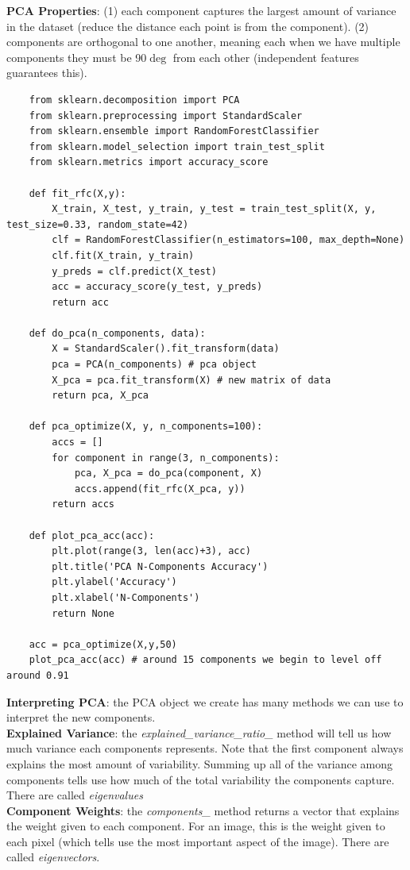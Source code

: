 \documentclass[11pt, a4paper]{article}
\begin{document}
\begin{spacing}{1.1}
	\noindent \textbf{PCA Properties}: (1) each component captures the largest amount of variance in the dataset (reduce the distance each point is from the component). (2) components are orthogonal to one another, meaning each when we have multiple components they must be 90$\deg$ from each other (independent features guarantees this).
	\begin{lstlisting}
	from sklearn.decomposition import PCA
	from sklearn.preprocessing import StandardScaler
	from sklearn.ensemble import RandomForestClassifier
	from sklearn.model_selection import train_test_split
	from sklearn.metrics import accuracy_score
	
	def fit_rfc(X,y):
		X_train, X_test, y_train, y_test = train_test_split(X, y, test_size=0.33, random_state=42)
		clf = RandomForestClassifier(n_estimators=100, max_depth=None)
		clf.fit(X_train, y_train)
		y_preds = clf.predict(X_test)
		acc = accuracy_score(y_test, y_preds)
		return acc
	
	def do_pca(n_components, data):
		X = StandardScaler().fit_transform(data)
		pca = PCA(n_components) # pca object
		X_pca = pca.fit_transform(X) # new matrix of data
		return pca, X_pca
	
	def pca_optimize(X, y, n_components=100):
		accs = []
		for component in range(3, n_components):
			pca, X_pca = do_pca(component, X)
			accs.append(fit_rfc(X_pca, y))
		return accs
	
	def plot_pca_acc(acc):
		plt.plot(range(3, len(acc)+3), acc)
		plt.title('PCA N-Components Accuracy')
		plt.ylabel('Accuracy')
		plt.xlabel('N-Components')
		return None
	
	acc = pca_optimize(X,y,50)
	plot_pca_acc(acc) # around 15 components we begin to level off around 0.91 
	\end{lstlisting} \vspace*{2mm}
	\textbf{Interpreting PCA}: the PCA object we create has many methods we can use to interpret the new components.\vspace*{2mm}\\
	\textbf{Explained Variance}: the \textit{explained\_variance\_ratio\_} method will tell us how much variance each components represents. Note that the first component always explains the most amount of variability. Summing up all of the variance among components tells use how much of the total variability the components capture. There are called \textit{eigenvalues} \vspace*{2mm}\\
	\textbf{Component Weights}: the \textit{components\_} method returns a vector that explains the weight given to each component. For an image, this is the weight given to each pixel (which tells use the most important aspect of the image). There are called \textit{eigenvectors}. \newpage


\end{spacing}
\end{document}
